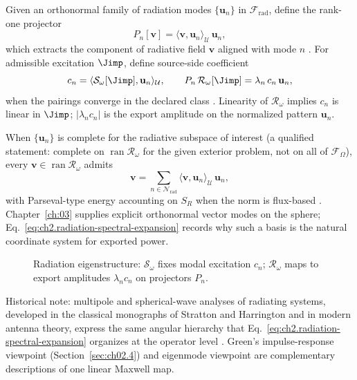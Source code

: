 Given an orthonormal family of radiation modes $\{\mathbf{u}_n\}$ in $\mathcal{F}_{\mathrm{rad}}$, define the rank-one projector
\begin{equation}
\label{eq:ch2.modal-projector-def}
P_n[\mathbf{v}]
=
\langle \mathbf{v},\mathbf{u}_n\rangle_{\mathcal{U}}\,\mathbf{u}_n,
\end{equation}
which extracts the component of radiative field $\mathbf{v}$ aligned with mode $n$ \cite{stratton1941}. For admissible excitation $\Jimp$, define source-side coefficient
\begin{equation}
\label{eq:ch2.source-modal-amplitude}
c_n
=
\langle \mathcal{S}_\omega[\Jimp],\mathbf{u}_n\rangle_{\mathcal{U}},
\qquad
P_n\,\mathcal{R}_\omega[\Jimp]
=
\lambda_n\,c_n\,\mathbf{u}_n,
\end{equation}
when the pairings converge in the declared class \cite{stratton1941,harrington2001}. Linearity of $\mathcal{R}_\omega$ implies $c_n$ is linear in $\Jimp$; $|\lambda_n c_n|$ is the export amplitude on the normalized pattern $\mathbf{u}_n$.

When $\{\mathbf{u}_n\}$ is complete for the radiative subspace of interest (a qualified statement: complete on $\operatorname{ran}\mathcal{R}_\omega$ for the given exterior problem, not on all of $\mathcal{F}_\Omega$), every $\mathbf{v}\in\operatorname{ran}\mathcal{R}_\omega$ admits
\begin{equation}
\label{eq:ch2.radiation-spectral-expansion}
\mathbf{v}
=
\sum_{n\in\mathcal{N}_{\mathrm{rad}}}
\langle \mathbf{v},\mathbf{u}_n\rangle_{\mathcal{U}}\,\mathbf{u}_n,
\end{equation}
with Parseval-type energy accounting on $S_R$ when the norm is flux-based \cite{stratton1941}. Chapter~\ref{ch:03} supplies explicit orthonormal vector modes on the sphere; Eq.~\eqref{eq:ch2.radiation-spectral-expansion} records why such a basis is the natural coordinate system for exported power.

\begin{figure}[t]
\centering
{}
\caption{Radiation eigenstructure: $\mathcal{S}_\omega$ fixes modal excitation $c_n$; $\mathcal{R}_\omega$ maps to export amplitudes $\lambda_n c_n$ on projectors $P_n$.}
\label{fig:ch2.radiation-spectral-decomposition}
\end{figure}

Historical note: multipole and spherical-wave analyses of radiating systems, developed in the classical monographs of Stratton and Harrington and in modern antenna theory, express the same angular hierarchy that Eq.~\eqref{eq:ch2.radiation-spectral-expansion} organizes at the operator level \cite{stratton1941,harrington2001,jackson1999}. Green's impulse-response viewpoint (Section~\ref{sec:ch02.4}) and eigenmode viewpoint are complementary descriptions of one linear Maxwell map.
